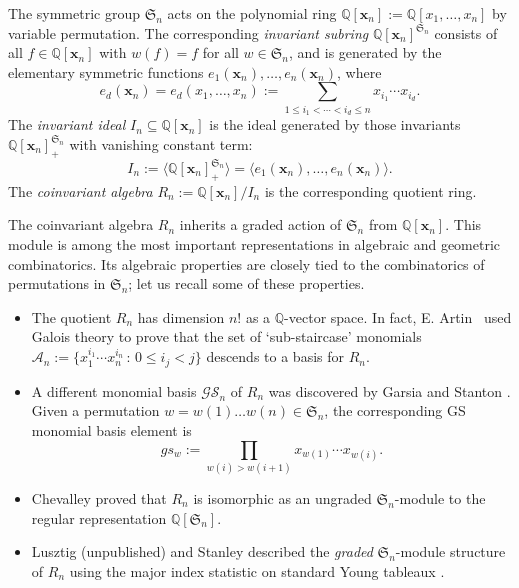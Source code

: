 \documentclass[ALCO,ThmDefs,published]{cedram}
\newcommand{\symm}{{\mathfrak{S}}}
\newcommand{\QQ}{{\mathbb {Q}}}
\newcommand{\xx}{{\mathbf {x}}}
\theoremstyle{plain}
\newcommand{\symm}{{\mathfrak{S}}}
\newcommand{\QQ}{{\mathbb {Q}}}
\newcommand{\AAA}{{\mathcal{A}}}
\newcommand{\GS}{{\mathcal{GS}}}
\newcommand{\xx}{{\mathbf {x}}}
\begin{document}
The symmetric group $\symm_n$ acts on the polynomial ring
$\QQ[\xx_n] := \QQ[x_1, \dots, x_n]$ by variable permutation.
The corresponding \emph{invariant subring} $\QQ[\xx_n]^{\symm_n}$ consists of all $f \in \QQ[\xx_n]$ with $w(f) = f$  
for all $w \in \symm_n$, 
and is generated 
by the elementary symmetric functions $e_1(\xx_n), \dots, e_n(\xx_n)$, where
\begin{equation}
e_d(\xx_n) = e_d(x_1, \dots, x_n) := \sum_{1 \leq i_1 < \cdots < i_d \leq n} x_{i_1} \cdots x_{i_d}.
\end{equation}
The \emph{invariant ideal} $I_n \subseteq \QQ[\xx_n]$ is the ideal generated by those invariants
$\QQ[\xx_n]^{\symm_n}_+$ with
vanishing constant term:
\begin{equation}
I_n := \langle \QQ[\xx_n]^{\symm_n}_+ \rangle = \langle e_1(\xx_n), \dots, e_n(\xx_n) \rangle.
\end{equation}
The \emph{coinvariant algebra} $R_n := {\QQ[\xx_n]} / {I_n}$ is the corresponding quotient ring. 


The coinvariant algebra $R_n$ inherits a graded action of $\symm_n$ from $\QQ[\xx_n]$.
This module is among the most important representations in algebraic and geometric combinatorics.
Its algebraic properties are closely tied to the combinatorics of permutations in $\symm_n$;
let us recall some of these properties.


\begin{itemize}
\item The quotient $R_n$ has dimension $n!$ as a  $\QQ$-vector space.  In fact, E. Artin~\cite{Artin} used Galois theory to prove that the set of `sub-staircase' monomials
$\AAA_n := \{ x_1^{i_1} \cdots x_n^{i_n} \,:\, 0 \leq i_j < j \}$ descends to a basis for $R_n$.
\item A different monomial 
basis $\GS_n$ of $R_n$ was discovered by Garsia and Stanton \cite{GS}.  Given a permutation
$w = w(1) \dots w(n) \in \symm_n$, the corresponding GS monomial basis element is
\begin{equation*}
gs_w := \prod_{w(i) > w(i+1)} x_{w(1)} \cdots x_{w(i)}.
\end{equation*}
\item Chevalley \cite{C} proved that $R_n$ is isomorphic as an ungraded $\symm_n$-module to the regular representation
$\QQ[\symm_n]$.
\item Lusztig (unpublished) and Stanley described the \emph{graded} 
$\symm_n$-module structure of $R_n$ using the major index statistic on standard Young tableaux \cite{Stanley}.
\end{itemize}
\end{document}
